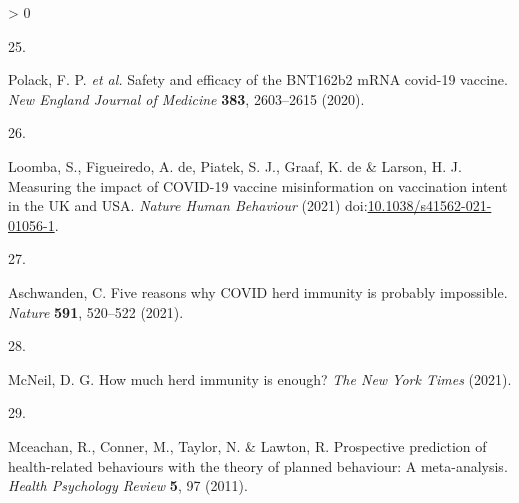 \documentclass[
  12pt,
]{article}
\newlength{\cslhangindent}
\newlength{\csllabelwidth}
\newenvironment{CSLReferences}[2] %
 {%
  \setlength{\parindent}{0pt}
  \ifodd #1 \everypar{\setlength{\hangindent}{\cslhangindent}}\ignorespaces\fi
  \ifnum #2 > 0
  \setlength{\parskip}{#2\baselineskip}
  \fi
 }%
 {}
\newcommand{\CSLLeftMargin}[1]{\parbox[t]{\csllabelwidth}{#1}}
\newcommand{\CSLRightInline}[1]{\parbox[t]{\linewidth - \csllabelwidth}{#1}\break}
\providecommand{\DIFaddbegin}{} %
\providecommand{\DIFaddend}{} %
\providecommand{\DIFdelbegin}{} %
\providecommand{\DIFdelend}{} %
\newcommand{\DIFscaledelfig}{0.5}
\newlength{\DIFdelgraphicswidth} %
\newlength{\DIFdelgraphicsheight} %
\newcommand{\DIFaddincludegraphics}[2][]{{\color{blue}\fbox{\DIFOincludegraphics[#1]{#2}}}} %
\newcommand{\DIFdelincludegraphics}[2][]{%
\sbox{\DIFdelgraphicsbox}{\DIFOincludegraphics[#1]{#2}}%
\settoboxwidth{\DIFdelgraphicswidth}{\DIFdelgraphicsbox} %
\settoboxtotalheight{\DIFdelgraphicsheight}{\DIFdelgraphicsbox} %
\scalebox{\DIFscaledelfig}{%
\parbox[b]{\DIFdelgraphicswidth}{\usebox{\DIFdelgraphicsbox}\\[-\baselineskip] \rule{\DIFdelgraphicswidth}{0em}}\llap{\resizebox{\DIFdelgraphicswidth}{\DIFdelgraphicsheight}{%
\setlength{\unitlength}{\DIFdelgraphicswidth}%
\begin{picture}(1,1)%
\thicklines\linethickness{2pt} %
{\color[rgb]{1,0,0}\put(0,0){\framebox(1,1){}}}%
{\color[rgb]{1,0,0}\put(0,0){\line( 1,1){1}}}%
{\color[rgb]{1,0,0}\put(0,1){\line(1,-1){1}}}%
\end{picture}%
}\hspace*{3pt}}} %
} %
\DeclareRobustCommand{\DIFaddbegin}{\DIFOaddbegin \let\includegraphics\DIFaddincludegraphics} %
\DeclareRobustCommand{\DIFaddend}{\DIFOaddend \let\includegraphics\DIFOincludegraphics} %
\DeclareRobustCommand{\DIFdelbegin}{\DIFOdelbegin \let\includegraphics\DIFdelincludegraphics} %
\DeclareRobustCommand{\DIFdelend}{\DIFOaddend \let\includegraphics\DIFOincludegraphics} %
\begin{document}
\begin{CSLReferences}{0}{0}
\leavevmode\hypertarget{ref-polack2020safety}{}%
\DIFdelbegin %
\DIFdelend \DIFaddbegin \CSLLeftMargin{25. }
\DIFaddend \CSLRightInline{Polack, F. P. \emph{et al.} Safety and efficacy of the BNT162b2 mRNA covid-19 vaccine. \emph{New England Journal of Medicine} \textbf{383}, 2603--2615 (2020).}

\leavevmode\hypertarget{ref-loomba_measuring_2021}{}%
\DIFdelbegin %
\DIFdelend \DIFaddbegin \CSLLeftMargin{26. }
\DIFaddend \CSLRightInline{Loomba, S., Figueiredo, A. de, Piatek, S. J., Graaf, K. de \& Larson, H. J. Measuring the impact of {COVID}-19 vaccine misinformation on vaccination intent in the {UK} and {USA}. \emph{Nature Human Behaviour} (2021) doi:\href{https://doi.org/10.1038/s41562-021-01056-1}{10.1038/s41562-021-01056-1}.}

\leavevmode\DIFdelbegin %
\DIFdelend \DIFaddbegin \hypertarget{ref-aschwanden2021five}{}\DIFaddend %
\DIFdelbegin %
\DIFdelend \DIFaddbegin \CSLLeftMargin{27. }
\CSLRightInline{Aschwanden, C. Five reasons why COVID herd immunity is probably impossible. \emph{Nature} \textbf{591}, 520--522 (2021).}
\DIFaddend 

\leavevmode\DIFdelbegin %
\DIFdelend \DIFaddbegin \hypertarget{ref-mcneil_2021}{}\DIFaddend %
\DIFdelbegin %
\DIFdelend \DIFaddbegin \CSLLeftMargin{28. }
\CSLRightInline{McNeil, D. G. How much herd immunity is enough? \emph{The New York Times} (2021).}
\DIFaddend 

\leavevmode\DIFdelbegin %

\DIFdelend \hypertarget{ref-mceachanetal2011}{}%
\DIFdelbegin %
\DIFdelend \DIFaddbegin \CSLLeftMargin{29. }
\DIFaddend \CSLRightInline{Mceachan, R., Conner, M., Taylor, N. \& Lawton, R. Prospective prediction of health-related behaviours with the theory of planned behaviour: A meta-analysis. \emph{Health Psychology Review} \textbf{5}, 97 (2011).}


\end{CSLReferences}
\end{document}
